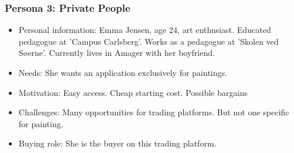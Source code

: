 \subsubsection{Persona 3: Private People}
\begin{itemize}
    \item Personal information: Emma Jensen, age 24, art enthusiast. Educated pedagogue at 'Campus Carlsberg'. Works as a pedagogue at 'Skolen ved Søerne'. Currently lives in Amager with her boyfriend.
    \item Needs: She wants an application exclusively for paintings.
    \item Motivation: Easy access. Cheap starting cost. Possible bargains
    \item  Challenges: Many opportunities for trading platforms. But not one specific for painting.
    \item Buying role: She is the buyer on this trading platform.
\end{itemize}
